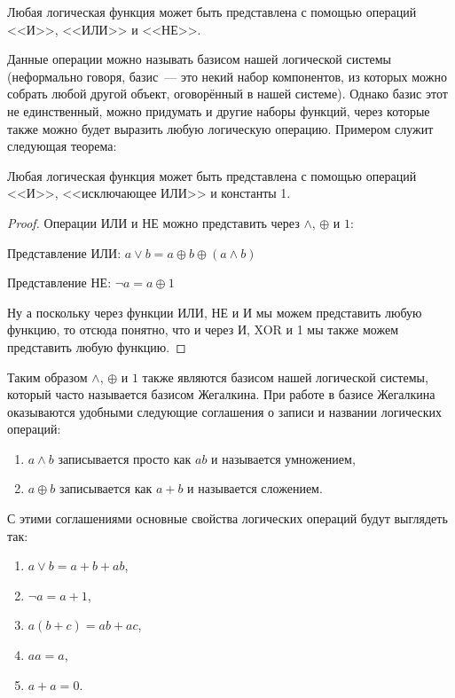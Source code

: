 \begin{thm}Любая логическая функция может быть представлена с помощью операций <<И>>, <<ИЛИ>> и <<НЕ>>.\end{thm}

Данные операции можно называть базисом нашей логической системы (неформально говоря, базис~--- это некий набор компонентов, из которых можно собрать любой другой объект, оговорённый в нашей системе). Однако базис этот не единственный, можно придумать и другие наборы функций, через которые \mbox{также} можно будет выразить любую логическую операцию. Примером служит следующая теорема:

\begin{thm}Любая логическая функция может быть представлена с помощью операций <<И>>, <<исключающее ИЛИ>> и константы 1.\end{thm}

\begin{proof}Операции ИЛИ и НЕ можно представить через $\land$, $\oplus$ и $1$:

Представление ИЛИ: $a\lor b = a \oplus b \oplus (a\land b)$

Представление НЕ: $\neg a = a \oplus 1$

Ну а поскольку через функции ИЛИ, НЕ и И мы можем представить любую функцию, то отсюда понятно, что и через И, XOR и 1 мы также можем представить любую функцию.\end{proof}

Таким образом $\land$, $\oplus$ и $1$ также являются базисом нашей логической системы, который часто называется базисом Жегалкина. При работе в базисе Жегалкина оказываются удобными следующие соглашения о записи и названии логических операций:

\begin{enumerate}
\item $a\land b$ записывается просто как $ab$ и называется умножением,
\item $a \oplus b$ записывается как $a + b$ и называется сложением.
\end{enumerate}

С этими соглашениями основные свойства логических операций будут выглядеть так:

\begin{enumerate}
\item $a\lor b=a + b +ab$,
\item $\neg a = a + 1$,
\item $a(b+c) = ab + ac$,
\item $aa = a$,
\item $a + a = 0$.
\end{enumerate}

